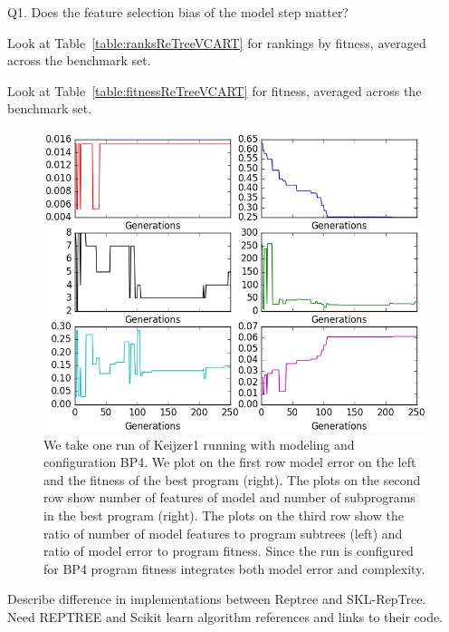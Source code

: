 Q1. Does the feature selection bias of the model step matter? 



Look at Table~\ref{table:ranksReTreeVCART} for rankings by fitness, averaged across the benchmark set.




Look at Table~\ref{table:fitnessReTreeVCART} for fitness, averaged across the benchmark set.


\begin{figure}[htbp]
\begin{center}
\includegraphics[width=0.99\linewidth]{sections/figures/figure_reptree.png}
\caption{We take one run of Keijzer1 running with \REPTREE modeling and configuration BP4.   We plot on the first row  model error on the left and the fitness of the best program (right).  The plots on the second row show number of features of model  and number of subprograms in the best program (right). The plots on the third row show the ratio of number of model features to program subtrees (left) and ratio of model error to program fitness. Since the run is configured for  BP4 program fitness integrates both model error and complexity.}
\label{fig:deepdive}
\end{center}
\end{figure}


Describe difference in implementations between Reptree and SKL-RepTree.\\
Need REPTREE and Scikit learn algorithm references and links to their code.

